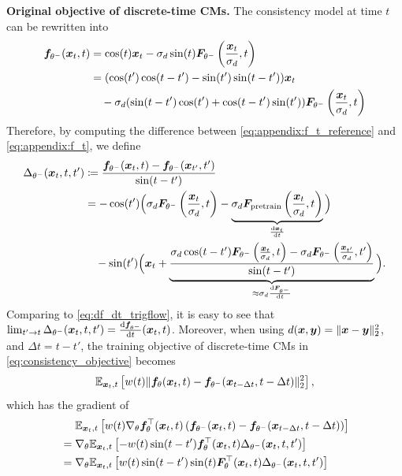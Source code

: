 \textbf{Original objective of discrete-time CMs. }
The consistency model at time $t$ can be rewritten into
\begin{equation}
\label{eq:appendix:f_t}
\begin{aligned}
{\bm{f}}_{\theta^-}({\bm{x}}_t,t)&=\cos(t){\bm{x}}_t-\sigma_d\sin(t){\bm{F}}_{\theta^-}\left(\frac{{\bm{x}}_t}{\sigma_d},t\right)\\
&=(\cos(t')\cos(t-t')-\sin(t')\sin(t-t')){\bm{x}}_t\\
&\quad -\sigma_d(\sin(t-t')\cos(t')+\cos(t-t')\sin(t')){\bm{F}}_{\theta^-}\left(\frac{{\bm{x}}_t}{\sigma_d},t\right)
\end{aligned}
\end{equation}
Therefore, by computing the difference between \eqref{eq:appendix:f_t_reference} and \eqref{eq:appendix:f_t}, we define
\begin{equation}
\label{eq:appendix_delta_trigflow}
\begin{split}
    \Delta_{\theta^-}({\bm{x}}_t,t,t') &\coloneqq \frac{{\bm{f}}_{\theta^-}({\bm{x}}_t,t) - {\bm{f}}_{\theta^-}({\bm{x}}_{t'},t')}{\sin(t-t')} \\
    &= -\cos(t')\Big(\sigma_d {\bm{F}}_{\theta^-}\left(\frac{{\bm{x}}_t}{\sigma_d},t\right)-\underbrace{\sigma_d {\bm{F}}_{\text{pretrain}}\left(\frac{{\bm{x}}_t}{\sigma_d},t\right)}_{\frac{\mathrm{d} {\bm{x}}_t}{\mathrm{d} t}}\Big)\\
&\quad -\sin(t')\Big({\bm{x}}_t+\underbrace{\frac{\sigma_d\cos(t-t'){\bm{F}}_{\theta^-}\left(\frac{{\bm{x}}_t}{\sigma_d},t\right)-\sigma_d {\bm{F}}_{\theta^-}\left(\frac{{\bm{x}}_{t'}}{\sigma_d},t'\right)}{\sin(t-t')}}_{\approx \sigma_d\frac{\mathrm{d} {\bm{F}}_{\theta^{-}}}{\mathrm{d} t}}\Big).
\end{split}
\end{equation}
Comparing to \eqref{eq:df_dt_trigflow}, it is easy to see that $\lim_{t'\to t}\Delta_{\theta^-}({\bm{x}}_t,t,t') = \frac{\mathrm{d} {\bm{f}}_{\theta^-}}{\mathrm{d} t}({\bm{x}}_t,t)$. Moreover, when using $d({\bm{x}},{\bm{y}})=\|{\bm{x}}-{\bm{y}}\|_2^2$, and $\Delta t = t -t'$, the training objective of discrete-time CMs in \eqref{eq:consistency_objective} becomes
\[
\mathbb{E}_{{\bm{x}}_t,t}\left[
w(t)\|{\bm{f}}_\theta({\bm{x}}_t,t) - {\bm{f}}_{\theta^-}({\bm{x}}_{t-\Delta t}, t-\Delta t)\|_2^2
\right],
\]
which has the gradient of
\begin{equation}
\label{eq:appendix:discrete_objective_original}
\begin{aligned}
&\phantom{{}={}}\E_{\x_t,t}\left[
w(t)\nabla_\theta \f^\top_\theta(\x_t,t)\left(\f_{\theta^-}(\x_t,t) - \f_{\theta^-}(\x_{t-\Delta t}, t-\Delta t)\right)
\right] \\
&= \nabla_{\theta}\E_{\x_t,t}\left[
-w(t)\sin(t-t')\f^\top_\theta(\x_t,t) \Delta_{\theta^-}(\x_t, t,t')
\right] \\
&= \nabla_{\theta}\E_{\x_t,t}\left[
w(t)\sin(t-t')\sin(t)\F^\top_\theta(\x_t,t) \Delta_{\theta^-}(\x_t, t,t')
\right]
\end{aligned}
\end{equation}

